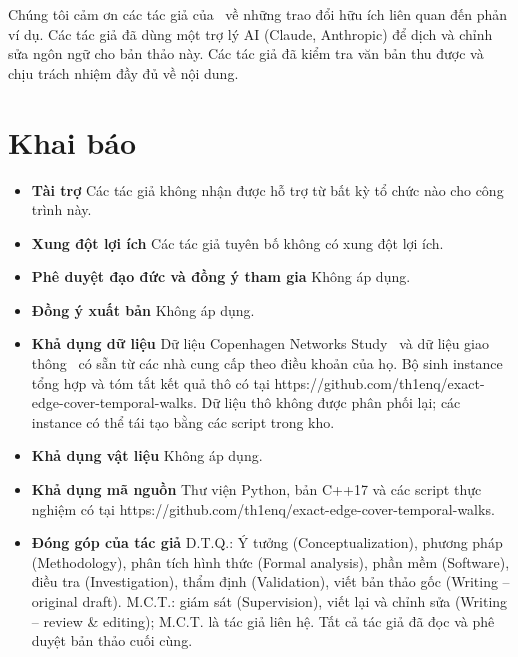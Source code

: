 \documentclass[pdflatex,sn-mathphys-num]{sn-jnl}
\theoremstyle{thmstyleone}%
\theoremstyle{thmstyletwo}%
\theoremstyle{thmstylethree}%
\begin{document}
\backmatter

Chúng tôi cảm ơn các tác giả của~\cite{deligkas2025} về những trao đổi hữu ích liên quan đến phản ví dụ. Các tác giả đã dùng một trợ lý AI (Claude, Anthropic) để dịch và chỉnh sửa ngôn ngữ cho bản thảo này. Các tác giả đã kiểm tra văn bản thu được và chịu trách nhiệm đầy đủ về nội dung.

\section*{Khai báo}

\begin{itemize}
\item \textbf{Tài trợ} Các tác giả không nhận được hỗ trợ từ bất kỳ tổ chức nào cho công trình này.
\item \textbf{Xung đột lợi ích} Các tác giả tuyên bố không có xung đột lợi ích.
\item \textbf{Phê duyệt đạo đức và đồng ý tham gia} Không áp dụng.
\item \textbf{Đồng ý xuất bản} Không áp dụng.
\item \textbf{Khả dụng dữ liệu} Dữ liệu Copenhagen Networks Study~\cite{sapiezynski2019} và dữ liệu giao thông~\cite{kujala2018} có sẵn từ các nhà cung cấp theo điều khoản của họ. Bộ sinh instance tổng hợp và tóm tắt kết quả thô có tại https://github.com/th1enq/exact-edge-cover-temporal-walks. Dữ liệu thô không được phân phối lại; các instance có thể tái tạo bằng các script trong kho.
\item \textbf{Khả dụng vật liệu} Không áp dụng.
\item \textbf{Khả dụng mã nguồn} Thư viện Python, bản C++17 và các script thực nghiệm có tại https://github.com/th1enq/exact-edge-cover-temporal-walks.
\item \textbf{Đóng góp của tác giả} D.T.Q.: Ý tưởng (Conceptualization), phương pháp (Methodology), phân tích hình thức (Formal analysis), phần mềm (Software), điều tra (Investigation), thẩm định (Validation), viết bản thảo gốc (Writing – original draft). M.C.T.: giám sát (Supervision), viết lại và chỉnh sửa (Writing – review \& editing); M.C.T. là tác giả liên hệ. Tất cả tác giả đã đọc và phê duyệt bản thảo cuối cùng.
\end{itemize}


\end{document}
